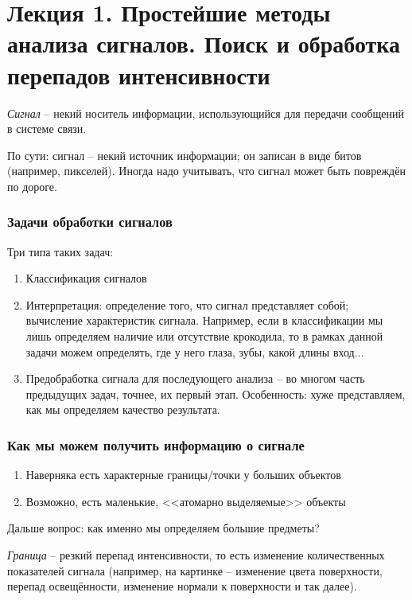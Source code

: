 \documentclass[main.tex]{subfiles}
\begin{document}
\section{Лекция 1. Простейшие методы анализа сигналов. Поиск и обработка перепадов интенсивности}

\emph{Сигнал} -- некий носитель информации, использующийся для передачи сообщений в системе связи.

По сути: сигнал -- некий источник информации; он записан в виде битов (например, пикселей).
Иногда надо учитывать, что сигнал может быть повреждён по дороге.

\subsubsection{Задачи обработки сигналов}

Три типа таких задач:

\begin{enumerate}[noitemsep]
	\item Классификация сигналов
	\item Интерпретация: определение того, что сигнал представляет собой; вычисление характеристик сигнала.
	Например, если в классификации мы лишь определяем наличие или отсутствие крокодила, то в рамках данной задачи можем определять, где у него глаза, зубы, какой длины вход...
	\item Предобработка сигнала для последующего анализа -- во многом часть предыдущих задач, точнее, их первый этап.
	Особенность: хуже представляем, как мы определяем качество результата.
\end{enumerate}

\subsubsection{Как мы можем получить информацию о сигнале}

\begin{enumerate}[noitemsep]
	\item Наверняка есть характерные границы/точки у больших объектов
	\item Возможно, есть маленькие, <<атомарно выделяемые>> объекты
\end{enumerate}

Дальше вопрос: как именно мы определяем большие предметы?

\emph{Граница} -- резкий перепад интенсивности, то есть изменение количественных показателей сигнала (например, на картинке -- изменение цвета поверхности, перепад освещённости, изменение нормали к поверхности и так далее).
\end{document}
